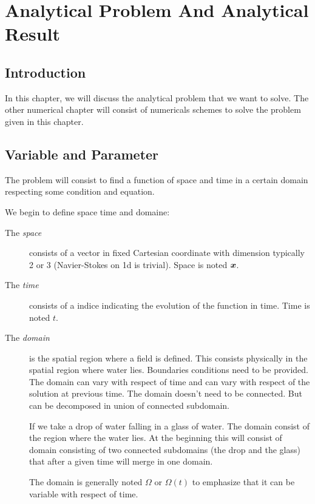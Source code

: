 \chapter{Analytical Problem And Analytical Result}

\minitoc
\section*{Introduction}
In this chapter, we will discuss the analytical problem that we want to solve.
The other numerical chapter will consist of numericals schemes to solve the problem given in this chapter.

\section{Variable and Parameter}

The problem will consist to find a function of space and time in a certain domain respecting some condition and equation.

We begin to define space time and domaine:
\begin{description}
\item[The \emph{space}] consists of a vector in fixed Cartesian coordinate with dimension typically 2 or 3 (Navier-Stokes on 1d is trivial).
Space is noted ${\boldsymbol {x}}$.
\item[The \emph{time}] consists of a indice indicating the evolution of the function in time.
Time is noted $t$.
\item[The \emph{domain}] is the spatial region where a field is defined. This consists physically in the spatial region where water lies.
Boundaries conditions need to be provided.
The domain can vary with respect of time and can vary with respect of the solution at previous time.
The domain doesn't need to be connected. But can be decomposed in union of connected subdomain.

\begin{example}
 If we take a drop of water falling in a glass of water. The domain consist of the region where the water lies.
 At the beginning this will consist of domain consisting of two connected subdomains (the drop and the glass)
 that after a given time will merge in one domain.
\end{example}

The domain is generally noted $\Omega$ or $\Omega(t)$ to emphasize that it can be variable with respect of time.
\end{description}


